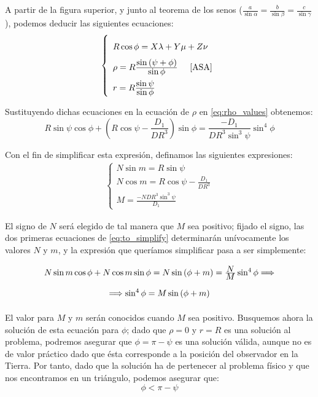 \documentclass[11pt]{article}
\newcommand\ddfrac[2]{\frac{\displaystyle #1}{\displaystyle #2}}
\begin{document}
A partir de la figura superior, y junto al teorema de los senos ($\ddfrac{a}{\sin{\alpha}}=\ddfrac{b}{\sin{\beta}}=\ddfrac{c}{\sin{\gamma}}$), podemos deducir las siguientes ecuaciones:
\begin{align}
\left\{
\begin{array}{l}
	R\cos{\phi}=X\lambda+Y\mu+Z\nu\\
	\rho=R\ddfrac{\sin{(\psi+\phi)}}{\sin{\phi}}\; \; \; \; \; \cite{ASA}\\
	r=R\ddfrac{\sin{\psi}}{\sin{\phi}}
\end{array}
\right.
\label{eq:triangle_relations}
\end{align}

Sustituyendo dichas ecuaciones en la ecuación de $\rho$ en \eqref{eq:rho_values} obtenemos:
\[
R\sin{\psi}\cos{\phi}+\left(R\cos{\psi}-\ddfrac{D_1}{DR^3}\right)\sin{\phi}=\ddfrac{-D_1}{DR^3\sin^3{\psi}}\sin^4{\phi}
\]

Con el fin de simplificar esta expresión, definamos las siguientes expresiones:
\begin{align}
\left\{
\begin{array}{l}
	N\sin{m}=R\sin{\psi}\\
	N\cos{m}=R\cos{\psi}-\ddfrac{D_1}{DR^3}\\
	M=\ddfrac{-NDR^3\sin^3{\psi}}{D_1}
\end{array}
\right.
\label{eq:to_simplify}
\end{align}

El signo de $N$ será elegido de tal manera que $M$ sea positivo; fijado el signo, las dos primeras ecuaciones de \eqref{eq:to_simplify} determinarán unívocamente los valores $N$ y $m$, y la expresión que queríamos simplificar pasa a ser simplemente:
\begin{align}
\def\arraystretch{2}
\begin{array}{c}
	N\sin{m}\cos{\phi}+N\cos{m}\sin{\phi}=N\sin{(\phi+m)}=\ddfrac{N}{M}\sin^4{\phi} \Longrightarrow\\
	\Longrightarrow\sin^4{\phi}=M\sin{(\phi+m)}
\end{array}
\label{eq:phi_solution}
\end{align}

El valor para $M$ y $m$ serán conocidos cuando $M$ sea positivo. Busquemos ahora la solución de esta ecuación para $\phi$; dado que $\rho=0$ y $r=R$ es una solución al problema, podremos asegurar que $\phi=\pi-\psi$ es una solución válida, aunque no es de valor práctico dado que ésta corresponde a la posición del observador en la Tierra. Por tanto, dado que la solución ha de pertenecer al problema físico y que nos encontramos en un triángulo, podemos asegurar que:
\[
\phi<\pi-\psi
\]
\end{document}
